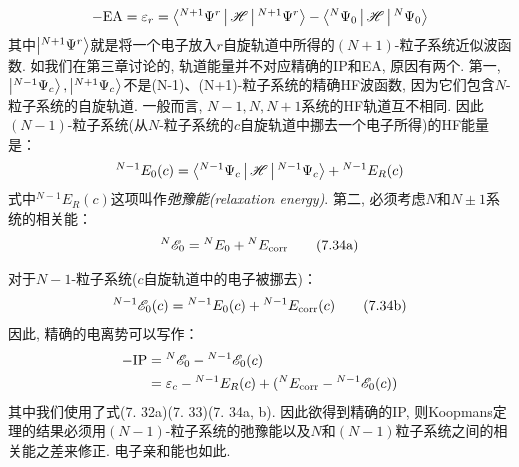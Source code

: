 \begin{align}
-\mathrm{EA} = \varepsilon_r = \Braket{^{N+1}\Psi^r|\mathscr{H}| ^{N+1}\Psi^r} - \Braket{^{N}\Psi_0|\mathscr{H}|^{N}\Psi_0}
\end{align}
其中$\Ket{^{N+1}\Psi^r}$就是将一个电子放入$r$自旋轨道中所得的$(N+1)$-粒子系统近似波函数. 
如我们在第三章讨论的, 
轨道能量并不对应精确的IP和EA, 
原因有两个. 
第一,
$\Ket{^{N-1}\Psi_c},\Ket{^{N+1}\Psi_c}$不是(N-1)、(N+1)-粒子系统的精确HF波函数, 
因为它们包含$N$-粒子系统的自旋轨道. 
一般而言, 
$N-1,N,N+1$系统的HF轨道互不相同. 
因此$(N-1)$-粒子系统(从$N$-粒子系统的$c$自旋轨道中挪去一个电子所得)的HF能量是：
\begin{align}
{}^{N-1}E_0(c) = \Braket{{}^{N-1}\Psi_c|\mathscr{H}|{}^{N-1}\Psi_c} + {}^{N-1}E_R(c)
\end{align}
式中${}^{N-1}E_R(c)$这项叫作\emph{弛豫能(relaxation energy)}. 
第二, 
必须考虑$N$和$N\pm1$系统的相关能：
\begin{align}
{}^N\mathscr{E}_0 = {}^NE_0 + {}^NE_\mathrm{corr}\tag{7.34a}
\end{align}
\addtocounter{equation}{-1}
对于$N-1$-粒子系统($c$自旋轨道中的电子被挪去)：
\begin{align}
{}^{N-1}\mathscr{E}_0(c) = {}^{N-1}E_0(c) + {}^{N-1}E_\mathrm{corr}(c)\tag{7.34b}
\end{align}
因此, 
精确的电离势可以写作：
\begin{align}
-\mathrm{IP} & = {}^N\mathscr{E}_0 - {}^{N-1}\mathscr{E}_0(c)\notag\\
             & = \varepsilon_c - {}^{N-1}E_R(c) + ({}^NE_\mathrm{corr} - {}^{N-1}\mathscr{E}_0(c))
\end{align}
其中我们使用了式(7.
32a)(7.
33)(7.
34a,
b). 
因此欲得到精确的IP, 
则Koopmans定理的结果必须用$(N-1)$-粒子系统的弛豫能以及$N$和$(N-1)$粒子系统之间的相关能之差来修正. 
电子亲和能也如此. 

